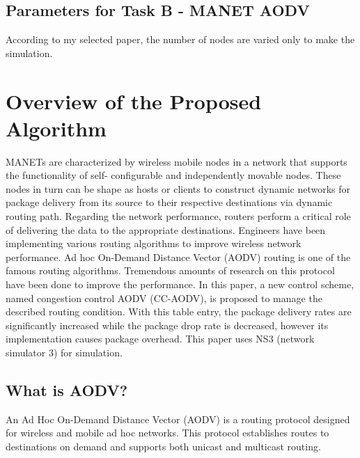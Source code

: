 \documentclass[12pt, a4paper]{article}
\begin{document}
\subsection{Parameters for Task B - MANET AODV}
According to my selected paper, the number of nodes are varied only to make the simulation.
\pagebreak

\section{ Overview of the Proposed Algorithm }
MANETs are characterized by wireless mobile
nodes in a network that supports the functionality of self-
configurable and independently movable nodes. These nodes in
turn can be shape as hosts or clients to construct dynamic
networks for package delivery from its source to their respective
destinations via dynamic routing path. Regarding the network
performance, routers perform a critical role of delivering the data
to the appropriate destinations. Engineers have been
implementing various routing algorithms to improve wireless
network performance. Ad hoc On-Demand Distance Vector
(AODV) routing is one of the famous routing algorithms.
Tremendous amounts of research on this protocol have been done
to improve the performance. In this paper, a new control scheme,
named congestion control AODV (CC-AODV), is proposed to
manage the described routing condition. With this table entry, the
package delivery rates are significantly increased while the
package drop rate is decreased, however its implementation causes
package overhead. This paper uses NS3 (network simulator 3) for
simulation.


\subsection{What is AODV?}
    An Ad Hoc On-Demand Distance Vector (AODV) is a routing protocol designed for wireless and mobile ad hoc networks. This protocol establishes routes to destinations on demand and supports both unicast and multicast routing.\\
\end{document}

